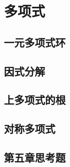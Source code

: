 \documentclass[zihao=-4,UTF8]{report}
\begin{document}
\chapter{多项式}
\thispagestyle{fancy} 
\section{一元多项式环}
\section{因式分解}
\section{上多项式的根}
\section{对称多项式}
\section{第五章思考题}

\nocite{*}

\thispagestyle{fancy} 
\end{document}
